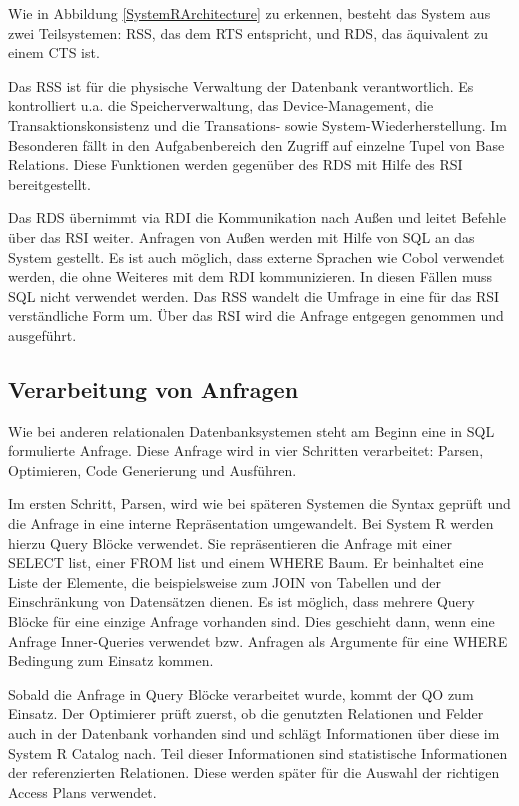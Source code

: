 Wie in Abbildung \ref{SystemRArchitecture} zu erkennen,  besteht das System aus zwei Teilsystemen: \ac{RSS}, das dem RTS entspricht, und \ac{RDS}, das äquivalent zu einem CTS ist.

Das \ac{RSS} ist für die physische Verwaltung der Datenbank verantwortlich. Es kontrolliert u.a. die Speicherverwaltung, das Device-Management, die Transaktionskonsistenz und die Transations- sowie System-Wiederherstellung. Im Besonderen fällt in den Aufgabenbereich den Zugriff auf einzelne Tupel von Base Relations. Diese Funktionen werden gegenüber des \ac{RDS} mit Hilfe des \ac{RSI} bereitgestellt.

Das \ac{RDS} übernimmt via \ac{RDI} die Kommunikation nach Außen und leitet Befehle über das \ac{RSI} weiter. Anfragen von Außen werden mit Hilfe von \ac{SQL} an das System gestellt. Es ist auch möglich, dass externe Sprachen wie Cobol verwendet werden, die ohne Weiteres mit dem \ac{RDI} kommunizieren. In diesen Fällen muss SQL nicht verwendet werden. Das \ac{RSS} wandelt die Umfrage in eine für das \ac{RSI} verständliche Form um. Über das RSI wird die Anfrage entgegen genommen und ausgeführt.




\subsection{Verarbeitung von Anfragen}

Wie bei anderen relationalen Datenbanksystemen steht am Beginn eine in \ac{SQL} formulierte Anfrage. Diese Anfrage wird in vier Schritten verarbeitet: Parsen,  Optimieren, Code Generierung und Ausführen.

Im ersten Schritt, Parsen, wird wie bei späteren Systemen die Syntax geprüft und die Anfrage in eine interne Repräsentation umgewandelt. Bei System R werden hierzu Query Blöcke verwendet. Sie repräsentieren die Anfrage mit einer SELECT list, einer FROM list und einem WHERE Baum. Er beinhaltet eine Liste der Elemente, die beispielsweise zum JOIN von Tabellen und der Einschränkung von Datensätzen dienen. Es ist möglich, dass mehrere Query Blöcke für eine einzige Anfrage vorhanden sind. Dies geschieht dann, wenn eine Anfrage Inner-Queries verwendet bzw. Anfragen als Argumente für eine WHERE Bedingung zum Einsatz kommen.


Sobald die Anfrage in Query Blöcke verarbeitet wurde, kommt der \ac{QO} zum Einsatz. Der Optimierer prüft zuerst, ob die genutzten Relationen und Felder auch in der Datenbank vorhanden sind und schlägt Informationen über diese im System R Catalog nach. Teil dieser Informationen sind statistische Informationen der referenzierten Relationen. Diese werden später für die Auswahl der richtigen Access Plans verwendet.

